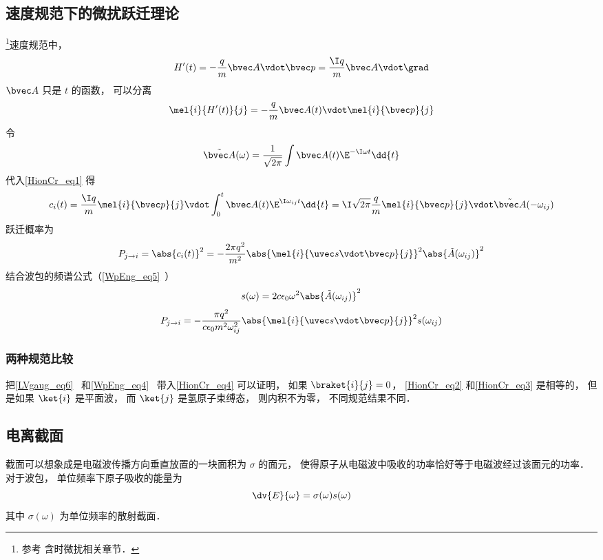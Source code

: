 \subsection{速度规范下的微扰跃迁理论}
\footnote{参考\cite{Merzbacher} 含时微扰相关章节．}速度规范中，
\begin{equation}
H'(t) = -\frac{q}{m}\bvec A \vdot \bvec p = \frac{\I q}{m}\bvec A \vdot \grad
\end{equation}
$\bvec A$ 只是 $t$ 的函数， 可以分离
\begin{equation}
\mel{i}{H'(t)}{j} = -\frac{q}{m}\bvec A(t) \vdot \mel{i}{\bvec p}{j}
\end{equation}
令
\begin{equation}
\tilde {\bvec A}(\omega) = \frac{1}{\sqrt{2\pi}} \int \bvec A(t) \E^{-\I\omega t} \dd{t}
\end{equation}
代入\autoref{HionCr_eq1} 得
\begin{equation}\label{HionCr_eq4}
c_i(t) = \frac{\I q}{m} \mel{i}{\bvec p}{j} \vdot \int_0^t  \bvec A(t) \E^{\I\omega_{ij} t} \dd{t} = \I\sqrt{2\pi}\frac{q}{m} \mel{i}{\bvec p}{j} \vdot \tilde {\bvec A}(-\omega_{ij})
\end{equation}
跃迁概率为
\begin{equation}\label{HionCr_eq3}
P_{j\to i} = \abs{c_i(t)}^2 = -\frac{2\pi q^2}{m^2} \abs{\mel{i}{\uvec s \vdot \bvec p}{j}}^2 \abs{\tilde {A}(\omega_{ij})}^2
\end{equation}
结合波包的频谱公式（\autoref{WpEng_eq5}~）
\begin{equation}
s(\omega) = 2c\epsilon_0 \omega^2 \abs{\tilde {A}(\omega_{ij})}^2
\end{equation}
\begin{equation}
P_{j\to i} = -\frac{\pi q^2}{c\epsilon_0 m^2 \omega_{ij}^2} \abs{\mel{i}{\uvec s \vdot \bvec p}{j}}^2 s(\omega_{ij})
\end{equation}

\subsubsection{两种规范比较}
把\autoref{LVgaug_eq6}~ 和\autoref{WpEng_eq4}~ 带入\autoref{HionCr_eq4} 可以证明， 如果 $\braket{i}{j} = 0$， \autoref{HionCr_eq2} 和\autoref{HionCr_eq3} 是相等的， 但是如果 $\ket{i}$ 是平面波， 而 $\ket{j}$ 是氢原子束缚态， 则内积不为零， 不同规范结果不同．

\subsection{电离截面}
截面可以想象成是电磁波传播方向垂直放置的一块面积为 $\sigma$ 的面元， 使得原子从电磁波中吸收的功率恰好等于电磁波经过该面元的功率． 对于波包， 单位频率下原子吸收的能量为
\begin{equation}
\dv{E}{\omega} = \sigma(\omega) s(\omega)
\end{equation}
其中 $\sigma(\omega)$ 为单位频率的散射截面．
